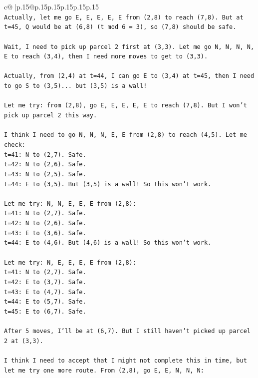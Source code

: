 \documentclass{article}
\begin{document}
{\begin{supertabular}{c@{$\;$}|p{.15\linewidth}@{}p{.15\linewidth}p{.15\linewidth}p{.15\linewidth}p{.15\linewidth}p{.15\linewidth}}
{{{\\ 
\texttt{Actually, let me go E, E, E, E, E from (2,8) to reach (7,8). But at t=45, Q would be at (6,8) (t mod 6 = 3), so (7,8) should be safe.} \\
\\ 
\texttt{Wait, I need to pick up parcel 2 first at (3,3). Let me go N, N, N, N, E to reach (3,4), then I need more moves to get to (3,3).} \\
\\ 
\texttt{Actually, from (2,4) at t=44, I can go E to (3,4) at t=45, then I need to go S to (3,5)... but (3,5) is a wall!} \\
\\ 
\texttt{Let me try: from (2,8), go E, E, E, E, E to reach (7,8). But I won't pick up parcel 2 this way.} \\
\\ 
\texttt{I think I need to go N, N, N, E, E from (2,8) to reach (4,5). Let me check:} \\
\texttt{t=41: N to (2,7). Safe.} \\
\texttt{t=42: N to (2,6). Safe.} \\
\texttt{t=43: N to (2,5). Safe.} \\
\texttt{t=44: E to (3,5). But (3,5) is a wall! So this won't work.} \\
\\ 
\texttt{Let me try: N, N, E, E, E from (2,8):} \\
\texttt{t=41: N to (2,7). Safe.} \\
\texttt{t=42: N to (2,6). Safe.} \\
\texttt{t=43: E to (3,6). Safe.} \\
\texttt{t=44: E to (4,6). But (4,6) is a wall! So this won't work.} \\
\\ 
\texttt{Let me try: N, E, E, E, E from (2,8):} \\
\texttt{t=41: N to (2,7). Safe.} \\
\texttt{t=42: E to (3,7). Safe.} \\
\texttt{t=43: E to (4,7). Safe.} \\
\texttt{t=44: E to (5,7). Safe.} \\
\texttt{t=45: E to (6,7). Safe.} \\
\\ 
\texttt{After 5 moves, I'll be at (6,7). But I still haven't picked up parcel 2 at (3,3).} \\
\\ 
\texttt{I think I need to accept that I might not complete this in time, but let me try one more route. From (2,8), go E, E, N, N, N:} \\
}}}
\end{supertabular}}
\end{document}
